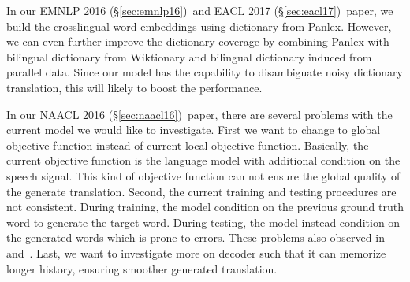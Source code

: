 \documentclass[12pt,twoside,final,hidelinks]{ltthesis}
\theoremstyle{definition}
\newcommand\naaclvi{NAACL 2016 (\S\ref{sec:naacl16})}
\newcommand\emnlpvi{EMNLP 2016 (\S\ref{sec:emnlp16})}
\newcommand\eaclvii{EACL 2017 (\S\ref{sec:eacl17})}
\begin{document}
In our \emnlpvi\ and \eaclvii\ paper, we build the crosslingual word embeddings using dictionary from Panlex. However, we can even further improve 
the dictionary coverage by combining Panlex with bilingual dictionary from Wiktionary and bilingual dictionary induced from parallel data. Since our model 
has the capability to disambiguate noisy dictionary translation, this will likely to boost the performance. 

In our \naaclvi\ paper, there are several problems with the current model we would like to investigate. First we want to change to global objective function 
instead of current local objective function. Basically, the current objective function is the language model with additional condition on the speech signal. 
This kind of objective function can not ensure the global quality of the generate translation. Second, the current training and testing procedures are not consistent. During training, the model condition on the previous ground truth word to generate the target word. During testing, the model instead condition 
on the generated words which is prone to errors. These problems also observed in~ and~. Last, we want to investigate more on decoder such that it can memorize longer history, ensuring smoother
generated translation. 
\end{document}
